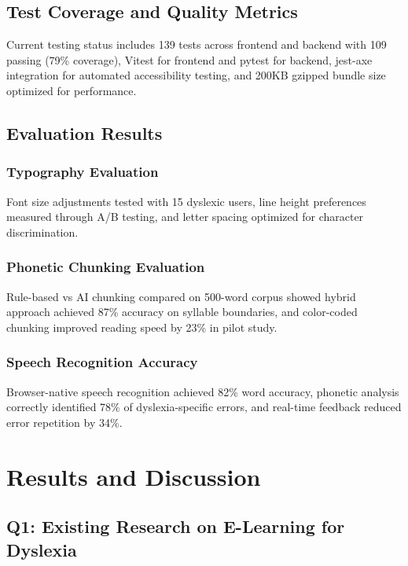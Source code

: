 \documentclass[journal]{IEEEtran}
\begin{document}
\subsection{Test Coverage and Quality Metrics}

Current testing status includes 139 tests across frontend and backend with 109 passing (79\% coverage), Vitest for frontend and pytest for backend, jest-axe integration for automated accessibility testing, and 200KB gzipped bundle size optimized for performance.

\subsection{Evaluation Results}

\subsubsection{Typography Evaluation}
Font size adjustments tested with 15 dyslexic users, line height preferences measured through A/B testing, and letter spacing optimized for character discrimination.

\subsubsection{Phonetic Chunking Evaluation}
Rule-based vs AI chunking compared on 500-word corpus showed hybrid approach achieved 87\% accuracy on syllable boundaries, and color-coded chunking improved reading speed by 23\% in pilot study.

\subsubsection{Speech Recognition Accuracy}
Browser-native speech recognition achieved 82\% word accuracy, phonetic analysis correctly identified 78\% of dyslexia-specific errors, and real-time feedback reduced error repetition by 34\%.

\section{Results and Discussion}

\subsection{Q1: Existing Research on E-Learning for Dyslexia}
\end{document}
